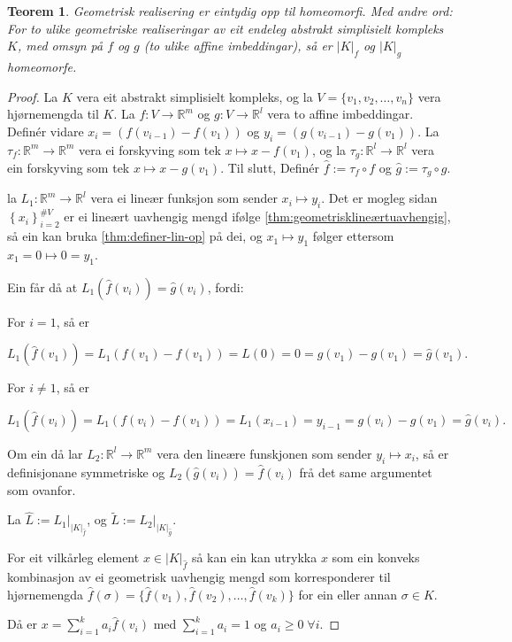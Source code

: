 \documentclass[a4paper, 12pt, norsk]{article}
\theoremstyle{plain}
\newtheorem{theorem}{Teorem}[section]
\theoremstyle{definition}
\newcommand{\Rb}{\mathbb{R}}
\newcommand{\gr}[1]{ \lvert #1 \rvert } %
\newcommand{\set}[1]{ \left\{ #1 \right\} } %
\begin{document}
\begin{theorem} \label{thm:gr-eintydig}
	Geometrisk realisering er eintydig opp til homeomorfi. Med andre ord: For to ulike geometriske realiseringar av eit endeleg abstrakt simplisielt kompleks $K$, med omsyn på $f$ og $g$ (to ulike affine imbeddingar), så er $\gr{K}_f$ og $\gr{K}_g$ homeomorfe.
\end{theorem}

\begin{proof}
	La $K$ vera eit abstrakt simplisielt kompleks, og la $V=\{ v_1, v_2, \dots, v_n \}$ vera hjørnemengda til $K$. La $f:V\to\Rb^m$ og $g:V\to\Rb^l$ vera to affine imbeddingar. Definér vidare $x_i=(f(v_{i-1})-f(v_1))$ og $y_i=(g(v_{i-1})-g(v_1))$. La $\tau_f:\Rb^m\to\Rb^m$ vera ei forskyving som tek $x\mapsto x-f(v_1)$, og la $\tau_g:\Rb^l\to\Rb^l$ vera ein forskyving som tek $x\mapsto x-g(v_1)$. Til slutt, Definér $\hat{f}:=\tau_f\circ f$ og $\hat{g}:=\tau_g \circ g$.
	
	la $L_1:\Rb^m\to\Rb^l$ vera ei lineær funksjon som sender $x_i\mapsto y_i$. Det er mogleg sidan \( \set{x_i}_{i=2}^{\#V} \) er ei lineært uavhengig mengd ifølge \autoref{thm:geometrisklineærtuavhengig}, så ein kan bruka \autoref{thm:definer-lin-op} på dei, og \( x_1 \mapsto y_1 \) følger ettersom \( x_1 = 0 \mapsto 0 = y_1 \).

	Ein får då at $L_1(\hat{f}(v_i))=\hat{g}(v_i)$, fordi:
	
	For $i=1$, så er

	\[
		L_1(\hat{f}(v_1))=L_1(f(v_1)-f(v_1))=L(0)=0=g(v_1)-g(v_1)=\hat{g}(v_1).
	\]

	For $i\neq 1$, så er

	\[
		L_1(\hat{f}(v_i))=L_1(f(v_i)-f(v_1))=L_1(x_{i-1})=y_{i-1}=g(v_i)-g(v_1)=\hat{g}(v_i).
	\]

	Om ein då lar $L_2:\Rb^l\to\Rb^m$ vera den lineære funskjonen som sender $y_i\mapsto x_i$, så er definisjonane symmetriske og \( L_2(\hat{g}(v_i))=\hat{f}(v_i) \) frå det same argumentet som ovanfor.

	La $\hat{L} := L_1|_{\gr{K}_{\hat{f}}}$, og $\tilde{L} := L_2|_{\gr{K}_{\hat{g}}}$.

	For eit vilkårleg element $x\in\gr{K}_{\hat{f}}$ så kan ein kan utrykka $x$ som ein konveks kombinasjon av ei geometrisk uavhengig mengd som korresponderer til hjørnemengda \( \hat{f}(\sigma) = \{\hat{f}(v_1), \hat{f}(v_2), \dots, \hat{f}(v_k)\} \) for ein eller annan \( \sigma \in K \).
	
	Då er $x=\sum_{i=1}^ka_i\hat{f}(v_i)$ med $\sum_{i=1}^ka_i=1$ og $a_i\geq0\; \forall i$. 
	

\end{proof}
\end{document}
